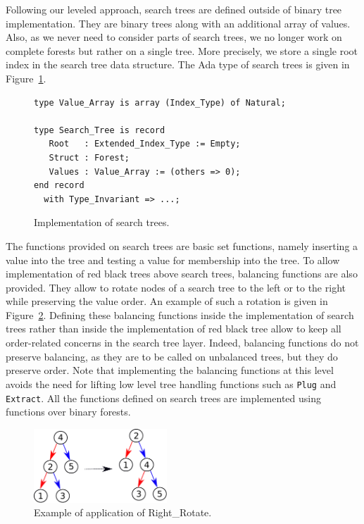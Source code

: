 \documentclass{llncs}
\begin{document}
Following our leveled approach, search trees are defined outside of binary tree implementation.
They are binary trees along with an additional array of values. Also, as we never need to consider
parts of search trees, we no longer work on complete forests but rather on a single tree. More
precisely, we store a single root index in the search tree data structure.
The Ada type of search trees is given in Figure~\ref{fig-search-typ}.

\begin{figure}[ht]
\begin{small}
\begin{lstlisting}
type Value_Array is array (Index_Type) of Natural;

type Search_Tree is record
   Root   : Extended_Index_Type := Empty;
   Struct : Forest;
   Values : Value_Array := (others => 0);
end record
  with Type_Invariant => ...;
\end{lstlisting}
\end{small}
\caption{\label{fig-search-typ} Implementation of search trees.}
\end{figure}

The functions provided on search trees are basic set functions, namely inserting a value into the tree
and testing a value for membership into the tree. To allow implementation of red black trees above
search trees, balancing functions are also provided. They allow to rotate nodes of a search tree to the
left or to the right while preserving the value order. An example of such a rotation is given in
Figure~\ref{fig-search-rot}.
Defining these balancing functions inside the implementation of
search trees rather than inside the implementation of red black tree allow to keep all order-related
concerns in the search tree layer. Indeed, balancing functions do not preserve balancing, as they
are to be called on unbalanced trees, but they do preserve order. Note that implementing the balancing
functions at this level avoids the need for lifting low level tree handling functions such as \texttt{Plug} and
\texttt{Extract}. All the functions defined on search trees are implemented using
functions over binary forests.

\begin{figure}[ht]
\begin{center}
\includegraphics[width=5cm]{rotate_right.pdf}
\caption{\label{fig-search-rot} Example of application of Right\_Rotate.}
\end{center}
\end{figure}
\end{document}
